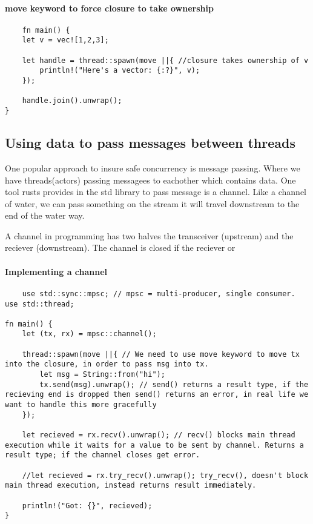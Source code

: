 \paragraph*{move keyword to force closure to take ownership}\begin{lstlisting}
    fn main() {
    let v = vec![1,2,3];
    
    let handle = thread::spawn(move ||{ //closure takes ownership of v
        println!("Here's a vector: {:?}", v);
    });

    handle.join().unwrap();
}
\end{lstlisting}
\subsection{Using data to pass messages between threads}
One popular approach to insure safe concurrency is message passing. Where we have threads(actors) passing messagees to eachother which contains data. One tool rusts provides in the std library to pass message is a channel. Like a channel of water, we can pass something on the stream it will travel downstream to the end of the water way.

A channel in programming has two halves the transceiver (upstream) and the reciever (downstream). The channel is closed if the reciever or  

\paragraph*{Implementing a channel}\begin{lstlisting}
    use std::sync::mpsc; // mpsc = multi-producer, single consumer.
use std::thread;

fn main() {
    let (tx, rx) = mpsc::channel();

    thread::spawn(move ||{ // We need to use move keyword to move tx into the closure, in order to pass msg into tx.
        let msg = String::from("hi");
        tx.send(msg).unwrap(); // send() returns a result type, if the recieving end is dropped then send() returns an error, in real life we want to handle this more gracefully
    });

    let recieved = rx.recv().unwrap(); // recv() blocks main thread execution while it waits for a value to be sent by channel. Returns a result type; if the channel closes get error.
    
    //let recieved = rx.try_recv().unwrap(); try_recv(), doesn't block main thread execution, instead returns result immediately.
    
    println!("Got: {}", recieved);
}
\end{lstlisting}

